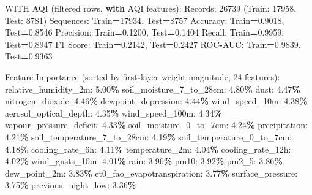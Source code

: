 \documentclass[
  letterpaper,
  DIV=11,
  numbers=noendperiod]{scrartcl}
\newenvironment{Shaded}{\begin{snugshade}}{\end{snugshade}}
\newcommand{\BuiltInTok}[1]{#1}
\newcommand{\ControlFlowTok}[1]{\textcolor[rgb]{0.13,0.29,0.53}{\textbf{#1}}}
\newcommand{\DecValTok}[1]{\textcolor[rgb]{0.00,0.00,0.81}{#1}}
\newcommand{\FloatTok}[1]{\textcolor[rgb]{0.00,0.00,0.81}{#1}}
\newcommand{\NormalTok}[1]{#1}
\newcommand{\OperatorTok}[1]{\textcolor[rgb]{0.81,0.36,0.00}{\textbf{#1}}}
\begin{document}
\begin{Shaded}
\begin{Highlighting}[]
\NormalTok{WITH AQI (filtered rows, }\ControlFlowTok{with}\NormalTok{ AQI features):}
\NormalTok{  Records: }\DecValTok{26739}\NormalTok{ (Train: }\DecValTok{17958}\NormalTok{, Test: }\DecValTok{8781}\NormalTok{)}
\NormalTok{  Sequences: Train}\OperatorTok{=}\DecValTok{17934}\NormalTok{, Test}\OperatorTok{=}\DecValTok{8757}
\NormalTok{  Accuracy: Train}\OperatorTok{=}\FloatTok{0.9018}\NormalTok{, Test}\OperatorTok{=}\FloatTok{0.8546}
\NormalTok{  Precision: Train}\OperatorTok{=}\FloatTok{0.1200}\NormalTok{, Test}\OperatorTok{=}\FloatTok{0.1404}
\NormalTok{  Recall: Train}\OperatorTok{=}\FloatTok{0.9959}\NormalTok{, Test}\OperatorTok{=}\FloatTok{0.8947}
\NormalTok{  F1 Score: Train}\OperatorTok{=}\FloatTok{0.2142}\NormalTok{, Test}\OperatorTok{=}\FloatTok{0.2427}
\NormalTok{  ROC}\OperatorTok{{-}}\NormalTok{AUC: Train}\OperatorTok{=}\FloatTok{0.9839}\NormalTok{, Test}\OperatorTok{=}\FloatTok{0.9363}

\NormalTok{  Feature Importance (}\BuiltInTok{sorted}\NormalTok{ by first}\OperatorTok{{-}}\NormalTok{layer weight magnitude, }\DecValTok{24}\NormalTok{ features):}
\NormalTok{    relative\_humidity\_2m: }\FloatTok{5.00}\OperatorTok{\%}
\NormalTok{    soil\_moisture\_7\_to\_28cm: }\FloatTok{4.80}\OperatorTok{\%}
\NormalTok{    dust: }\FloatTok{4.47}\OperatorTok{\%}
\NormalTok{    nitrogen\_dioxide: }\FloatTok{4.46}\OperatorTok{\%}
\NormalTok{    dewpoint\_depression: }\FloatTok{4.44}\OperatorTok{\%}
\NormalTok{    wind\_speed\_10m: }\FloatTok{4.38}\OperatorTok{\%}
\NormalTok{    aerosol\_optical\_depth: }\FloatTok{4.35}\OperatorTok{\%}
\NormalTok{    wind\_speed\_100m: }\FloatTok{4.34}\OperatorTok{\%}
\NormalTok{    vapour\_pressure\_deficit: }\FloatTok{4.33}\OperatorTok{\%}
\NormalTok{    soil\_moisture\_0\_to\_7cm: }\FloatTok{4.24}\OperatorTok{\%}
\NormalTok{    precipitation: }\FloatTok{4.21}\OperatorTok{\%}
\NormalTok{    soil\_temperature\_7\_to\_28cm: }\FloatTok{4.19}\OperatorTok{\%}
\NormalTok{    soil\_temperature\_0\_to\_7cm: }\FloatTok{4.18}\OperatorTok{\%}
\NormalTok{    cooling\_rate\_6h: }\FloatTok{4.11}\OperatorTok{\%}
\NormalTok{    temperature\_2m: }\FloatTok{4.04}\OperatorTok{\%}
\NormalTok{    cooling\_rate\_12h: }\FloatTok{4.02}\OperatorTok{\%}
\NormalTok{    wind\_gusts\_10m: }\FloatTok{4.01}\OperatorTok{\%}
\NormalTok{    rain: }\FloatTok{3.96}\OperatorTok{\%}
\NormalTok{    pm10: }\FloatTok{3.92}\OperatorTok{\%}
\NormalTok{    pm2\_5: }\FloatTok{3.86}\OperatorTok{\%}
\NormalTok{    dew\_point\_2m: }\FloatTok{3.83}\OperatorTok{\%}
\NormalTok{    et0\_fao\_evapotranspiration: }\FloatTok{3.77}\OperatorTok{\%}
\NormalTok{    surface\_pressure: }\FloatTok{3.75}\OperatorTok{\%}
\NormalTok{    previous\_night\_low: }\FloatTok{3.36}\OperatorTok{\%}


\end{Highlighting}
\end{Shaded}
\end{document}
